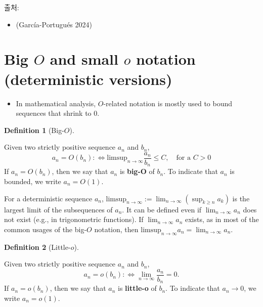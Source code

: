 \documentclass[
  letterpaper,
  DIV=11,
  numbers=noendperiod]{scrreprt}
\providecommand{\tightlist}{%
  \setlength{\itemsep}{0pt}\setlength{\parskip}{0pt}}
\theoremstyle{definition}
\theoremstyle{plain}
\theoremstyle{plain}
\theoremstyle{definition}
\theoremstyle{plain}
\theoremstyle{definition}
\newtheorem{definition}{Definition}[chapter]
\theoremstyle{remark}
\begin{document}
출처:

\begin{itemize}
\tightlist
\item
  (García-Portugués 2024)
\end{itemize}

\section{\texorpdfstring{Big \(O\) and small \(o\) notation
(deterministic
versions)}{Big O and small o notation (deterministic versions)}}\label{big-o-and-small-o-notation-deterministic-versions}

\begin{itemize}
\tightlist
\item
  In mathematical analysis, \(O\)-related notation is mostly used to
  bound sequences that shrink to \(0\).
\end{itemize}

\begin{definition}[Big-\(O\)]\protect\hypertarget{def-bigoh}{}\label{def-bigoh}

Given two strictly positive sequence \(a_n\) and \(b_n\), \[
a_n = O(b_n): \Longleftrightarrow \text{limsup}_{n\rightarrow \infty}\frac{a_n}{b_n} \leq C, \quad{} \text{for a } C>0
\] If \(a_n = O(b_n)\), then we say that \(a_n\) is \textbf{big-O} of
\(b_n\). To indicate that \(a_n\) is bounded, we write \(a_n = O(1)\).

\end{definition}

For a deterministic sequence \(a_n\),
\(\text{limsup}_{n\rightarrow \infty}:=\lim_{n\rightarrow \infty}(\sup_{k \geq n} a_k)\)
is the largest limit of the subsequences of \(a_n\). It can be defined
even if \(\lim_{n\rightarrow\infty}a_n\) does not exist (e.g., in
trigonometric functions). If \(\lim_{n\rightarrow\infty} a_n\) exists,
as in most of the common usages of the big-\(O\) notation, then
\(\text{limsup}_{n\rightarrow\infty}a_n = \lim_{n\rightarrow\infty}a_n\).

\begin{definition}[Little-\(o\)]\protect\hypertarget{def-littleoh}{}\label{def-littleoh}

Given two strictly positive sequence \(a_n\) and \(b_n\), \[
a_n = o(b_n): \Longleftrightarrow \lim_{n\rightarrow\infty} \frac{a_n}{b_n} = 0.
\] If \(a_n = o(b_n)\), then we say that \(a_n\) is \textbf{little-o} of
\(b_n\). To indicate that \(a_n\rightarrow 0\), we write \(a_n = o(1)\).

\end{definition}
\end{document}
